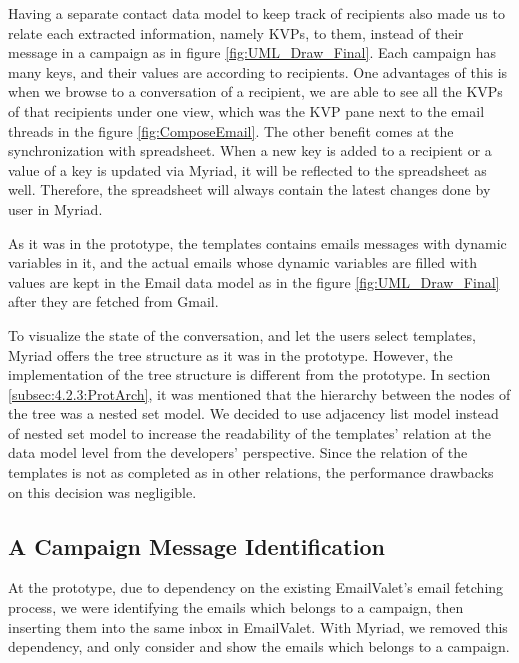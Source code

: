 Having a separate contact data model to keep track of recipients also made us to relate each extracted information, namely \ac{KVP}s, to them, instead of their message in a campaign as in figure \ref{fig:UML_Draw_Final}. Each campaign has many keys, and their values are according to recipients. One advantages of this is when we browse to a conversation of a recipient, we are able to see all the \ac{KVP}s of that recipients under one view, which was the \ac{KVP} pane next to the email threads in the figure \ref{fig:ComposeEmail}. The other benefit comes at the synchronization with spreadsheet. When a new key is added to a recipient or a value of a key is updated via Myriad, it will be reflected to the spreadsheet as well. Therefore, the spreadsheet will always contain the latest changes done by user in Myriad. 
\vspace{1cm}

As it was in the prototype, the templates contains emails messages with dynamic variables in it, and the actual emails whose dynamic variables are filled with values are kept in the Email data model as in the figure \ref{fig:UML_Draw_Final} after they are fetched from Gmail.
\vspace{1cm}

To visualize the state of the conversation, and let the users select templates, Myriad offers the tree structure as it was in the prototype. However, the implementation of the tree structure is different from the prototype. In section \ref{subsec:4.2.3:ProtArch}, it was mentioned that the hierarchy between the nodes of the tree was a nested set model. We decided to use adjacency list model instead of nested set model to increase the readability of the templates' relation at the data model level from the developers' perspective. Since the relation of the templates is not as completed as in other relations, the performance drawbacks on this decision was negligible. 

\subsection{A Campaign Message Identification}
\label{subsec:5.3.3:MessIden}
At the prototype, due to dependency on the existing EmailValet's email fetching process, we were identifying the emails which belongs to a campaign, then inserting them into the same inbox in EmailValet. With Myriad, we removed this dependency, and only consider and show the emails which belongs to a campaign.
\vspace{1cm}

